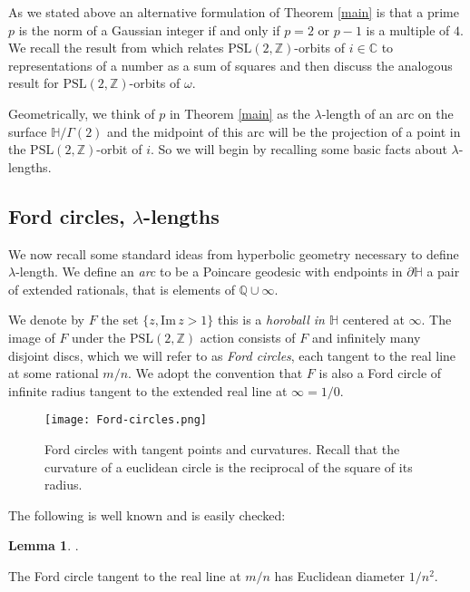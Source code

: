 \documentclass[12pt]{amsart}
\theoremstyle{plain}
\theoremstyle{definition}
\newtheorem{lem}[thm]{Lemma}
\def\HH{\mathbb{H}}
\def\im{\mathrm{Im}\,}
\def\xx{\HH/g2}
\def\ZZ{\mathbb{Z}}
\def\CC{\mathbb{C}}
\def\QQ{\mathbb{Q}}
\def\sl2{\mathrm{PSL}(2, \ZZ)}
\def\g2{\Gamma(2)}
\def\xx{\HH/\g2}
\begin{document}
As we stated above an alternative formulation 
of Theorem \ref{main}  is that
a prime $p$ is the norm of a Gaussian integer
if and only if $p=2$ or $p-1$ is a multiple of $4$.
We recall the result from \cite{vlad} 
which relates $\sl2$-orbits of $i \in \CC$
to representations of a number as a sum of squares
and then discuss the analogous result for 
$\sl2$-orbits of $ \omega$.

Geometrically, we think of $p$ in Theorem \ref{main}
as the $\lambda$-length of an arc on the surface $\xx$
and the midpoint of this arc will be the projection 
of a point in the $\sl2$-orbit of $i$.
So we will begin by recalling some basic facts about
$\lambda$-lengths.

\subsection{Ford circles, $\lambda$-lengths} 
\label{lengths}

We now recall some standard ideas from hyperbolic geometry
necessary to define $\lambda$-length.
We define an \textit{arc} to be a Poincare geodesic
with endpoints in $\partial \HH$ a pair of extended rationals, 
that is elements of $\QQ \cup \infty$.

We denote by $F$ the set  $\{ z, \im z > 1\}$
this is a \textit{horoball in $\HH$} centered at $\infty$.
The image of $F$ under the $\sl2$ action consists of
$F$ and infinitely many disjoint discs, 
which we will refer to as \textit{Ford circles}, 
each tangent to the real line at some rational $m/n$.
We adopt the convention that $F$ is also a Ford circle of infinite radius
tangent to the extended real line at $\infty = 1/0$.


  \begin{figure}[ht]
\begin{center}
\texttt{[image: Ford-circles.png]} 
\end{center}
\caption{Ford circles with tangent points and curvatures.
Recall that the 
curvature of a euclidean circle is the reciprocal of the square of its radius.}%
\end{figure}

The following is well known and is easily checked:

\begin{lem}\label{ford}.

The Ford circle tangent to the real line at $m/n$
has Euclidean diameter $1/n^2$.
\end{lem}
\end{document}
